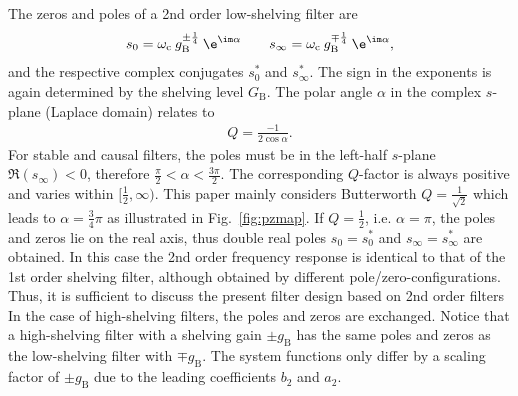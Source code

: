 %
The zeros and poles of a 2nd order low-shelving filter are
\begin{align}
s_{0} = \omega_\mathrm{c} \:g_\mathrm{B}^{\pm\frac{1}{4}} \: \e^{\im\alpha}\qquad
s_{\infty} = \omega_\mathrm{c} \: g_\mathrm{B}^{\mp\frac{1}{4}} \: \e^{\im\alpha},
\end{align}
and the respective complex conjugates $s_{0}^{\ast}$ and $s_{\infty}^{\ast}$.
The sign in the exponents is again determined
by the shelving level $G_\mathrm{B}$.
The polar angle $\alpha$ in the complex $s$-plane (Laplace domain)
relates to
\begin{align}
Q = \frac{-1}{2\cos\alpha}.
\end{align}
For stable and causal filters,
the poles must be in the left-half $s$-plane $\Re(s_{\infty}) < 0$,
therefore $\frac{\pi}{2} < \alpha < \frac{3\pi}{2}$.
The corresponding $Q$-factor is always positive
and varies within $[\frac{1}{2}, \infty)$.
This paper mainly considers Butterworth \cite{Ballou2008} $Q=\frac{1}{\sqrt{2}}$
which leads to $\alpha=\frac{3}{4} \pi$
as illustrated in Fig.~\ref{fig:pzmap}.
If $Q=\frac{1}{2}$, i.e. $\alpha=\pi$,
the poles and zeros lie on the real axis,
thus double real poles $s_{0} = s_{0}^{\ast}$ and
$s_{\infty} = s_{\infty}^{\ast}$ are obtained.
%
In this case the 2nd order frequency
response is identical to that of the 1st order shelving filter, although
obtained by different pole/zero-configurations.
%
Thus, it is sufficient to discuss the present filter design based on
2nd order filters
%
\NewL In the case of high-shelving filters, the poles and zeros are exchanged. %
Notice that a high-shelving filter with a shelving gain $\pm g_\mathrm{B}$
has the same poles and zeros as the low-shelving filter with $\mp g_\mathrm{B}$.
The system functions only differ by a scaling factor of $\pm g_\mathrm{B}$
due to the leading coefficients $b_{2}$ and $a_{2}$.

